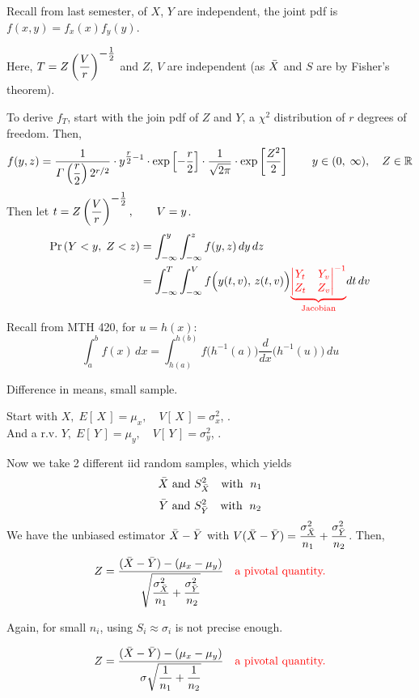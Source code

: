 \begin{enumerate}[label=\textcircled{\raisebox{-1pt}{\arabic*}}]
    \nl Recall from last semester, of $X$, $Y$ are independent, the joint pdf is $f(x,y) = f_x(x)f_y(y)$.

    \nl Here, $T = Z \pars{\dfrac{V}{r}}^{\textstyle  -\frac{1}{2} }$ and $Z$, $V$ are independent (as $\bar{X}$ and $S$ are by Fisher's theorem).

    \nl To derive $f_T$, start with the join pdf of $Z$ and $Y$, a $\chi^2$ distribution of $r$ degrees of freedom. Then,
    $$f(y,z) = \frac{1}{\varGamma \pars{\dfrac{r}{2}} 2^{\scriptstyle r\scriptstyle/2 }} \cdot \displaystyle y^{\textstyle \frac{r}{2} \scriptstyle - 1} \cdot \exp\brac{-\frac{r}{2}} \cdot \over{\sqrt{2\pi}} \cdot \exp \brac{ \dfrac{Z^2}{2}} \qquad y\in(0,\;\infty), \quad Z \in \R$$
    Then let $t = Z \pars{\dfrac{V}{r}}^{\textstyle -\frac{1}{2}}, \qquad V = y$.
    \begin{align*}
        \P{Y<y,\; Z<z} &= \int_{-\infty}^{y} \int_{-\infty}^{z} f(y,z)\,dy\,dz\\
        &= \int_{-\infty}^{T} \int_{-\infty}^{V} f\Big(y(t,v),\, z(t,v)\Big) \red{\underbrace{\detx{Y_t}{Y_v}{Z_t}{Z_v}^{-1}}_{\text{Jacobian}}}  dt\,dv
    \end{align*}
    \setGreen Recall from MTH 420, for $u = h(x)$:
    $$\int_a^b f(x)\,dx = \int_{h(a)}^{h(b)} f\big(h^{-1}(a)\big) \frac{d}{dx}\Big(h^{-1}(u)\Big)\,du$$\setBlack

    \disc    Difference in means, small sample.

    \nl Start with $X,\; E[\,X\,] = \mu_x, \quad V[\,X\,] = \sigma^2_x$, .\\
    And a r.v. $Y,\; E[\,Y\,] = \mu_y, \quad V[\,Y\,] = \sigma^2_y$, .

    \nl Now we take 2 different iid random samples, which yields
    $$\bar{X} \text{ and } S_{\bar{X}}^2 \quad \text{with } \; n_1$$
    $$\bar{Y} \text{ and } S_{\bar{Y}}^2 \quad \text{with } \; n_2$$
    We have the unbiased estimator $\bar{X} - \bar{Y}$ with $V(\bar{X} - \bar{Y}) = \dfrac{\sigma^2_{\bar{X}}}{n_1} + \dfrac{\sigma^2_{\bar{Y}}}{n_2}$. Then,
    $$Z = \frac{(\bar{X} - \bar{Y}) - (\mu_x - \mu_y)}{\displaystyle \sqrt{\dfrac{\sigma^2_{\bar{X}}}{n_1} + \dfrac{\sigma^2_{\bar{Y}}}{n_2}}} \quad \text{\color{red}{a pivotal quantity.}\color{black}}$$

    \nl Again, for small $n_i$, using $S_i \approx \sigma_i$ is not precise enough.

    \nl {}
    $$Z = \frac{(\bar{X} - \bar{Y}) - (\mu_x - \mu_y)}{\displaystyle \sigma \sqrt{\dfrac{1}{n_1} + \dfrac{1}{n_2}}} \quad \text{\color{red}{a pivotal quantity.}\color{black}}$$


\end{enumerate}
